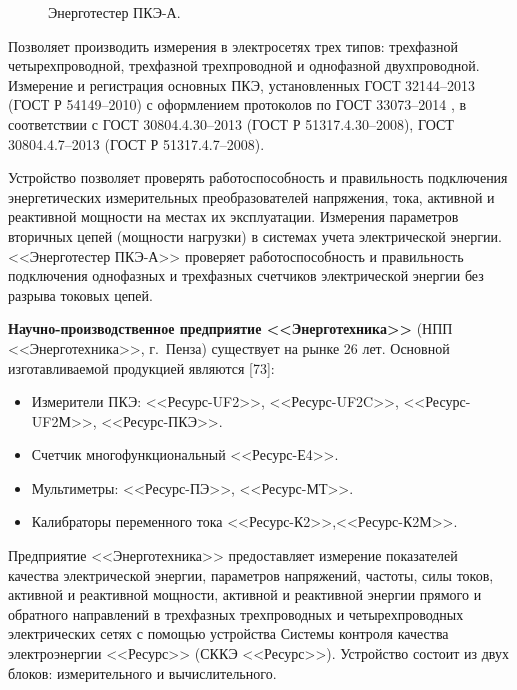 \begin{figure}[ht]
	\caption{Энерготестер ПКЭ-А.}\label{fig:picture10}
\end{figure}

Позволяет производить измерения в электросетях трех типов: трехфазной четырехпроводной, трехфазной трехпроводной и однофазной двухпроводной. Измерение и регистрация основных ПКЭ, установленных ГОСТ 32144--2013 \cite{ГОСТ32144-2013} (ГОСТ Р 54149--2010) с оформлением протоколов по ГОСТ 33073--2014 \cite{ГОСТ33073-2014}, в соответствии с ГОСТ 30804.4.30--2013 \cite{ГОСТ30804.4.30-2013} (ГОСТ Р 51317.4.30--2008), ГОСТ 30804.4.7--2013 \cite{ГОСТ30804.4.7-2013} (ГОСТ Р 51317.4.7--2008). 

Устройство позволяет проверять работоспособность и правильность подключения энергетических измерительных преобразователей напряжения, тока, активной и реактивной мощности на местах их эксплуатации. Измерения параметров вторичных цепей (мощности нагрузки) в системах учета электрической энергии. <<Энерготестер ПКЭ-А>>  проверяет работоспособность и правильность подключения однофазных и трехфазных счетчиков электрической энергии без разрыва токовых цепей.

\textbf{Научно-производственное предприятие <<Энерготехника>>}  (НПП <<Энерготехника>>, г.~Пенза) существует на рынке 26 лет. Основной изготавливаемой продукцией являются [73]: 

\begin{itemize}
	\item Измерители ПКЭ: <<Ресурс-UF2>>, <<Ресурс-UF2C>>, <<Ресурс-UF2М>>, <<Ресурс-ПКЭ>>.
	\item Счетчик многофункциональный <<Ресурс-Е4>>.
	\item Мультиметры: <<Ресурс-ПЭ>>, <<Ресурс-МТ>>.
	\item Калибраторы переменного тока <<Ресурс-К2>>,<<Ресурс-К2М>>.
\end{itemize}

Предприятие <<Энерготехника>> предоставляет измерение показателей качества электрической энергии, параметров напряжений, частоты, силы токов, активной и реактивной мощности, активной и реактивной энергии прямого и обратного направлений в трехфазных трехпроводных и четырехпроводных электрических сетях с помощью устройства Системы контроля качества электроэнергии <<Ресурс>> (СККЭ <<Ресурс>>). Устройство состоит из двух блоков: измерительного и  вычислительного.

